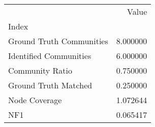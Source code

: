 \begin{tabular}{lr}
\toprule
{} &     Value \\
Index                    &           \\
\midrule
Ground Truth Communities &  8.000000 \\
Identified Communities   &  6.000000 \\
Community Ratio          &  0.750000 \\
Ground Truth Matched     &  0.250000 \\
Node Coverage            &  1.072644 \\
NF1                      &  0.065417 \\
\bottomrule
\end{tabular}
